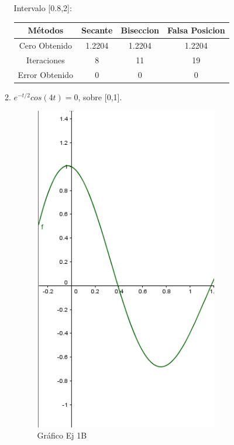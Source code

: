 \documentclass{udpreport}
\begin{document}
\begin{enumerate}
\begin{enumerate}
            \begin{table}[H]Intervalo [0.8,2]:
            \centering
                \begin{tabular} { |c|c|c|c|}
                    \hline
                    Métodos       & Secante & Biseccion & Falsa Posicion  \\
                    \hline
                Cero Obtenido &  1.2204       &    1.2204       &      1.2204    \\
                \hline
                Iteraciones   &     8       &      11     &        19          \\
                \hline
                Error Obtenido &    0         &      0       &      0        \\
                 \hline
                \end{tabular}
            \end{table}
    
        
    \item \( e^{-t/2} cos(4t) = 0 \), sobre [0,1].
    
        \begin{figure}[H]
            \centering
            \includegraphics[width=8cm]{GraficoEj1b}
            \caption{Gráfico Ej 1B}
        \end{figure}
        

\end{enumerate}
\end{enumerate}
\end{document}
